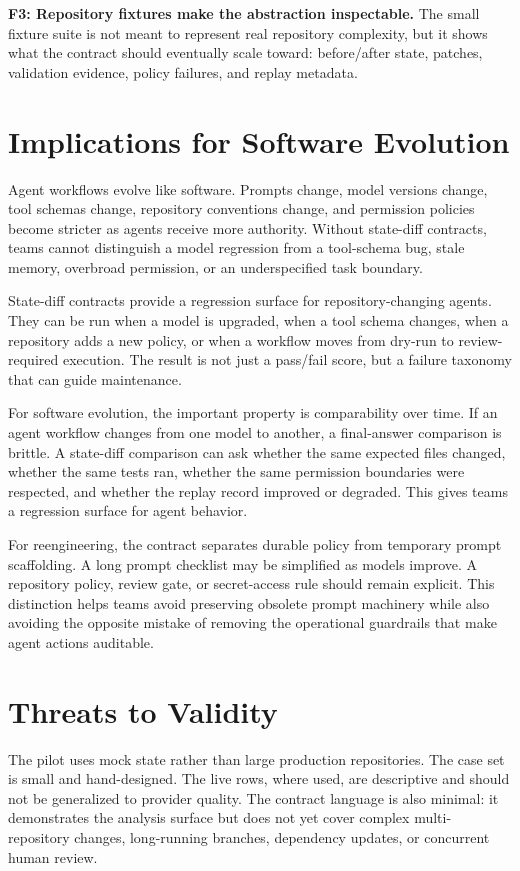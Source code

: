 \documentclass[10pt,conference]{IEEEtran}
\begin{document}
\textbf{F3: Repository fixtures make the abstraction inspectable.} The small
fixture suite is not meant to represent real repository complexity, but it
shows what the contract should eventually scale toward: before/after state,
patches, validation evidence, policy failures, and replay metadata.

\section{Implications for Software Evolution}

Agent workflows evolve like software. Prompts change, model versions change,
tool schemas change, repository conventions change, and permission policies
become stricter as agents receive more authority. Without state-diff contracts,
teams cannot distinguish a model regression from a tool-schema bug, stale
memory, overbroad permission, or an underspecified task boundary.

State-diff contracts provide a regression surface for repository-changing
agents. They can be run when a model is upgraded, when a tool schema changes,
when a repository adds a new policy, or when a workflow moves from dry-run to
review-required execution. The result is not just a pass/fail score, but a
failure taxonomy that can guide maintenance.

For software evolution, the important property is comparability over time. If
an agent workflow changes from one model to another, a final-answer comparison
is brittle. A state-diff comparison can ask whether the same expected files
changed, whether the same tests ran, whether the same permission boundaries
were respected, and whether the replay record improved or degraded. This gives
teams a regression surface for agent behavior.

For reengineering, the contract separates durable policy from temporary prompt
scaffolding. A long prompt checklist may be simplified as models improve. A
repository policy, review gate, or secret-access rule should remain explicit.
This distinction helps teams avoid preserving obsolete prompt machinery while
also avoiding the opposite mistake of removing the operational guardrails that
make agent actions auditable.

\section{Threats to Validity}

The pilot uses mock state rather than large production repositories. The case
set is small and hand-designed. The live rows, where used, are descriptive and
should not be generalized to provider quality. The contract language is also
minimal: it demonstrates the analysis surface but does not yet cover complex
multi-repository changes, long-running branches, dependency updates, or
concurrent human review.
\end{document}
